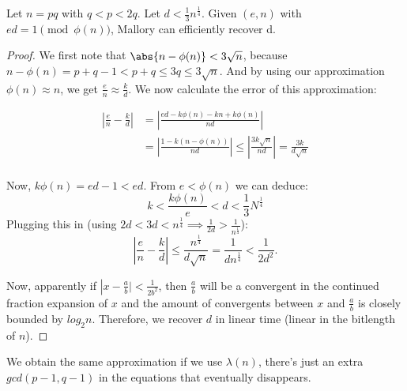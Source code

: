 \begin{theorem}
  Let $n = pq$ with $q < p < 2q$. Let $d < \frac{1}{3}n^{\frac{1}{4}}$. Given $(e, n)$ with $ed = 1 \pmod{\phi(n)}$, Mallory can efficiently recover d.
\end{theorem}

\begin{proof}

We first note that $\abs{n - \phi(n)} < 3\sqrt{n}$, because $n - \phi(n) = p + q - 1 < p + q \leq 3q \leq 3\sqrt{n}$. 
And by using our approximation $\phi(n) \approx n$, we get $\frac{e}{n} \approx \frac{k}{d}$. We now calculate the error of this approximation:

\begin{align*}
  \left|\frac{e}{n} - \frac{k}{d}\right|
  &= \left|\frac{ed - k\phi(n) - kn + k\phi(n)}{nd}\right| \\
  &= \left|\frac{1 - k(n - \phi(n))}{nd}\right|
    \leq \left|\frac{3k\sqrt{n}}{nd}\right| = \frac{3k}{d\sqrt{n}} \\ 
\end{align*}

Now, $k\phi(n) = ed - 1 < ed$. From $e < \phi(n)$ we can deduce:
\[ k < \frac{k\phi(n)}{e} < d < \frac{1}{3}N^{\frac{1}{4}}\]
Plugging this in (using $2d < 3d < n^{\frac{1}{4}} \implies \frac{1}{2d} > \frac{1}{n^{\frac{1}{4}}}$):
\[ \left|\frac{e}{n} - \frac{k}{d}\right| \leq \frac{n^{\frac{1}{4}}}{d\sqrt{n}} = \frac{1}{dn^{\frac{1}{4}}} < \frac{1}{2d^2}. \]

Now, apparently if $\left|x - \frac{a}{b}| < \frac{1}{2b^2}$, then $\frac{a}{b}$ will be a convergent in the continued fraction expansion of $x$ and the amount of convergents between $x$ and $\frac{a}{b}$ is closely bounded by $log_2n$. Therefore, we recover $d$ in linear time (linear in the bitlength of $n$).
\end{proof}

We obtain the same approximation if we use $\lambda(n)$, there's just an extra $gcd(p-1,q-1)$ in the equations that eventually disappears.
